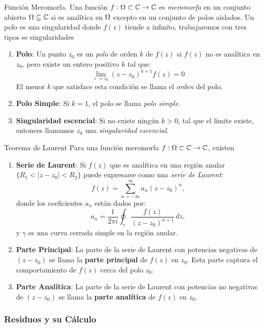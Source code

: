 \documentclass[main.tex]{subfiles}
\begin{document}
\begin{def.}{Función Meromorfa.}
\noindent Una función \(f:\Omega\subset\mathbb C \to\mathbb C \) es \emph{meromorfa} en un conjunto abierto \(\Omega \subseteq \mathbb{C}\) si es analítica en \(\Omega\) excepto en un conjunto de polos aislados. Un polo es una singularidad donde \(f(z)\) tiende a infinito, trabajaremos con tres tipos se singularidades

\begin{enumerate}
\item \textbf{Polo}:
Un punto \(z_0\) es un \emph{polo} de orden \(k\) de \(f(z)\) si \(f(z)\) no es analítica en \(z_0\), pero existe un entero positivo \(k\) tal que:
\[
\lim_{z \to z_0} (z - z_0)^{k+1} f(z)=0
\]
El menor \(k\) que satisface esta condición se llama el \emph{orden} del polo.

\item \textbf{Polo Simple}: Si \(k = 1\), el polo se llama \emph{polo simple}.

\item \textbf{Singularidad escencial}: Si no existe  ningún \(k > 0\), tal que el límite existe, entonces llamamos \(z_0\) una \emph{singularidad escencial}.
\end{enumerate}
\end{def.}

\begin{teorema}{Teorema de Laurent}
Para una función meromorfa \(f:\Omega\subset\mathbb C \to\mathbb C \), existen
\begin{enumerate}
\item \textbf{Serie de Laurent}:
Si \(f(z)\) que es analítica en una región anular \(\{R_1 < |z - z_0| < R_2\}\) puede expresarse como una \emph{serie de Laurent}:
\[
f(z) = \sum_{n=-\infty}^\infty a_n (z - z_0)^n,
\]
donde los coeficientes \(a_n\) están dados por:
\[
a_n = \frac{1}{2\pi i} \oint_\gamma \frac{f(z)}{(z - z_0)^{n+1}} \, dz,
\]
y \(\gamma\) es una curva cerrada simple en la región anular.

\item \textbf{Parte Principal}:
La parte de la serie de Laurent con potencias negativas de \((z - z_0)\) se llama la \textbf{parte principal} de \(f(z)\) en \(z_0\). Esta parte captura el comportamiento de \(f(z)\) cerca del polo \(z_0\).

\item \textbf{Parte Analítica}:
La parte de la serie de Laurent con potencias no negativas de \((z - z_0)\) se llama la \textbf{parte analítica} de \(f(z)\) en \(z_0\).
\end{enumerate}
\end{teorema}
\noindent\subsubsection{Residuos y su Cálculo}
\end{document}
